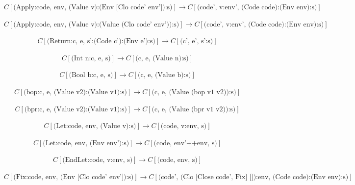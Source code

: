 \documentclass[10pt]{article}
\begin{document}
\[
	C[\text{(Apply:code, env, (Value v):(Env [Clo code' env']):s)}] \rightarrow C[\text{(code', v:env', (Code code):(Env env):s)}]  
\]
\ \\
\[
	C[\text{(Apply:code, env, (Value v):(Value (Clo code' env')):s)}] \rightarrow C[\text{(code', v:env', (Code code):(Env env):s)}]  
\]
\ \\
\[
	C[\text{(Return:c, e, s':(Code c'):(Env e'):s)}] \rightarrow C[\text{(c', e', s':s)}]  
\]
\ \\
\[
	C[\text{(Int n:c, e, s)}] \rightarrow C[\text{(c, e, (Value n):s)}]  
\]
\ \\
\[
	C[\text{(Bool b:c, e, s)}] \rightarrow C[\text{(c, e, (Value b):s)}]  
\]
\ \\
\[
	C[\text{(bop:c, e, (Value v2):(Value v1):s)}] \rightarrow C[\text{(c, e, (Value (bop v1 v2)):s)}]  
\]
\ \\
\[
	C[\text{(bpr:c, e, (Value v2):(Value v1):s)}] \rightarrow C[\text{(c, e, (Value (bpr v1 v2)):s)}]  
\]
\ \\
\[
	C[\text{(Let:code, env, (Value v):s)}] \rightarrow C[\text{(code, v:env, s)}]  
\]
\ \\
\[
	C[\text{(Let:code, env, (Env env'):s)}] \rightarrow C[\text{(code, env'++env, s)}]  
\]
\ \\
\[
	C[\text{(EndLet:code, v:env, s)}] \rightarrow C[\text{(code, env, s)}]  
\]
\ \\
\[
	C[\text{(Fix:code, env, (Env [Clo code' env']):s)}] \rightarrow C[\text{(code', (Clo [Close code', Fix] []):env, (Code code):(Env env):s)}]  
\]
\end{document}
